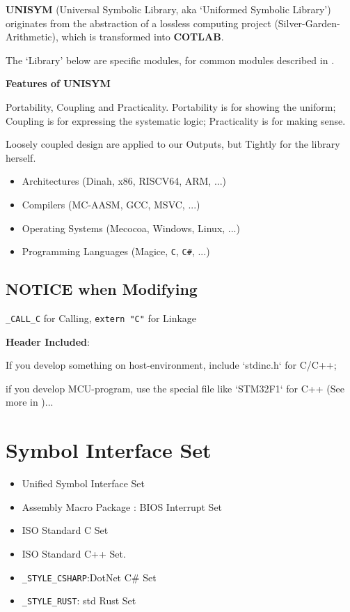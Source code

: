 \textbf{UNISYM} (Universal Symbolic Library, aka `Uniformed Symbolic Library') originates from the abstraction of a lossless computing project (Silver-Garden-Arithmetic), which is transformed into \textbf{COTLAB}.

The `Library' below are specific modules, for common modules described in .

\textbf{Features of UNISYM}

Portability, Coupling and Practicality. Portability is for showing the uniform; Coupling is for expressing the systematic logic; Practicality is for making sense.

Loosely coupled design are applied to our Outputs, but Tightly for the library herself.

\begin{itemize}

\item Architectures (Dinah, x86, RISCV64, ARM, ...)
\item Compilers (MC-AASM, GCC, MSVC, ...)
\item Operating Systems (Mecocoa, Windows, Linux, ...)
\item Programming Languages (Magice, \verb|C|, \verb|C#|, ...)
\end{itemize}



\subsection{NOTICE when Modifying}

\verb|_CALL_C| for Calling, \verb|extern "C"| for Linkage

\textbf{Header Included}:

If you develop something on host-environment, include `stdinc.h` for C/C++;

if you develop MCU-program, use the special file like `STM32F1` for C++ (See more in )...



\section{Symbol Interface Set}

\begin{itemize}

\item Unified Symbol Interface Set
\item Assembly Macro Package : BIOS Interrupt Set
\item ISO Standard C Set
\item ISO Standard C++ Set.
\item \verb|_STYLE_CSHARP|:DotNet C\# Set
\item \verb|_STYLE_RUST|: std Rust Set
\end{itemize}



